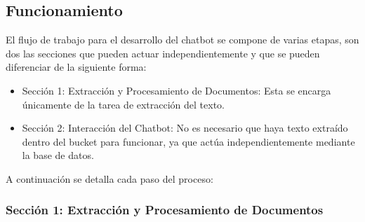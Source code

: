 \subsection{Funcionamiento}\label{funcionamiento-aws}
El flujo de trabajo para el desarrollo del chatbot se compone de varias etapas, son dos las secciones que pueden actuar independientemente y que se pueden diferenciar de la siguiente forma:  

\begin{itemize}
    \item Sección 1: Extracción y Procesamiento de Documentos: Esta se encarga únicamente de la tarea de extracción del texto.
    \item Sección 2: Interacción del Chatbot: No es necesario que haya texto extraído dentro del bucket para funcionar, ya que actúa independientemente mediante la base de datos. 
\end{itemize}

A continuación se detalla cada paso del proceso:

\subsubsection{Sección 1: Extracción y Procesamiento de Documentos}


